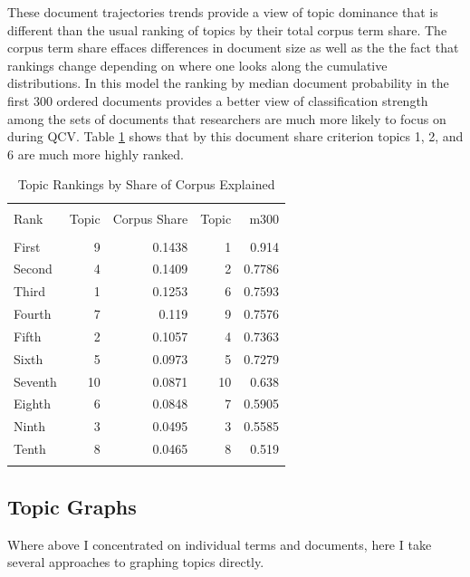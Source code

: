 \documentclass[]{book}
\theoremstyle{definition}
\theoremstyle{definition}
\theoremstyle{definition}
\theoremstyle{remark}
\begin{document}
These document trajectories trends provide a view of topic dominance
that is different than the usual ranking of topics by their total corpus
term share. The corpus term share effaces differences in document size
as well as the the fact that rankings change depending on where one
looks along the cumulative distributions. In this model the ranking by
median document probability in the first 300 ordered documents provides
a better view of classification strength among the sets of documents
that researchers are much more likely to focus on during QCV. Table
\ref{tab:topshare} shows that by this document share criterion topics 1,
2, and 6 are much more highly ranked.

\begin{table}[!htbp] \centering 
  \caption{Topic Rankings by Share of Corpus Explained} 
  \label{tab:topshare} 
\begin{tabular}{@{\extracolsep{5pt}} lrrrr} 
\\[-1.8ex]\hline 
\hline \\[-1.8ex] 
Rank & Topic  & Corpus Share & Topic & m300 \\ 
\hline \\[-1.8ex] 
First & 9 & 0.1438 & 1 & 0.914 \\ 
Second & 4 & 0.1409 & 2 & 0.7786 \\ 
Third & 1 & 0.1253 & 6 & 0.7593 \\ 
Fourth & 7 & 0.119 & 9 & 0.7576 \\ 
Fifth & 2 & 0.1057 & 4 & 0.7363 \\ 
Sixth & 5 & 0.0973 & 5 & 0.7279 \\ 
Seventh & 10 & 0.0871 & 10 & 0.638 \\ 
Eighth & 6 & 0.0848 & 7 & 0.5905 \\ 
Ninth & 3 & 0.0495 & 3 & 0.5585 \\ 
Tenth & 8 & 0.0465 & 8 & 0.519 \\ 
\hline \\[-1.8ex] 
\end{tabular} 
\end{table}

\hypertarget{topic-graphs}{%
\subsection{Topic Graphs}\label{topic-graphs}}

Where above I concentrated on individual terms and documents, here I
take several approaches to graphing topics directly.
\end{document}
